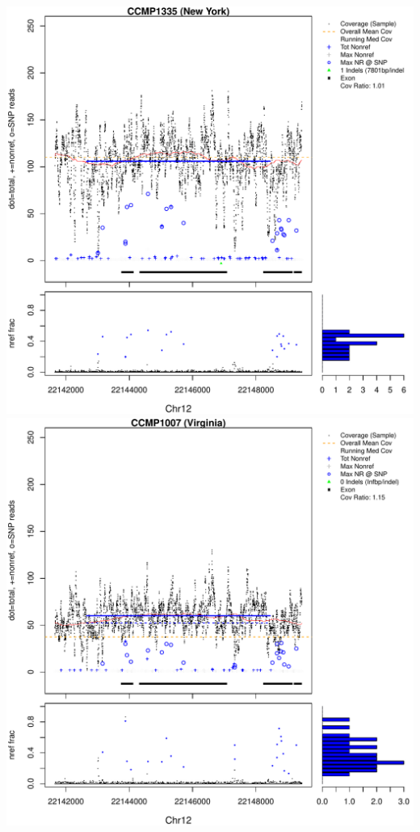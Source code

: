 \documentclass{article}\usepackage[]{graphicx}\usepackage[]{color}
\makeatletter
\def\maxwidth{ %
  \ifdim\Gin@nat@width>\linewidth
    \linewidth
  \else
    \Gin@nat@width
  \fi
}
\newenvironment{knitrout}{}{} %
\makeatother
\begin{document}
\begin{knitrout}
{\centering \includegraphics[width=\maxwidth]{figs-knitr/unnamed-chunk-56-1} 
\includegraphics[width=\maxwidth]{figs-knitr/unnamed-chunk-56-2} 
}
\end{knitrout}
\end{document}
